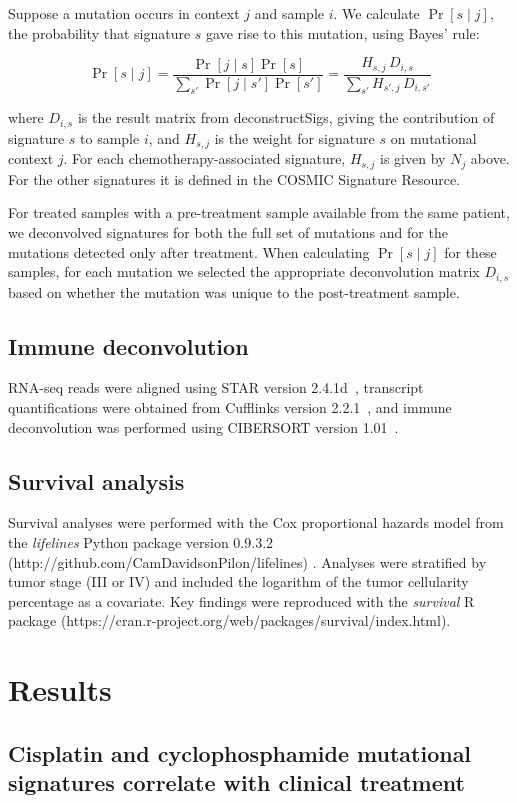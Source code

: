 \documentclass[linenumbers]{bmcart}
\begin{document}
Suppose a mutation occurs in context $j$ and sample $i$. We calculate $\Pr[s \mid j]$, the probability that signature $s$ gave rise to this mutation, using Bayes' rule:

\[
\Pr[s \mid j] = \frac{\Pr[j \mid s] \Pr[s]}{\sum_{s'}{\Pr[j \mid s']\Pr[s']}} = \frac{H_{s,j} \, D_{i,s}}{\sum_{s'}{H_{s',j} \, D_{i,s'}}}
\]

where $D_{i,s}$ is the result matrix from deconstructSigs, giving the contribution of signature $s$ to sample $i$, and $H_{s,j}$ is the weight for signature $s$ on mutational context $j$. For each chemotherapy-associated signature, $H_{s,j}$ is given by $N_j$ above. For the other signatures it is defined in the COSMIC Signature Resource.

For treated samples with a pre-treatment sample available from the same patient, we deconvolved signatures for both the full set of mutations and for the mutations detected only after treatment. When calculating $\Pr[s \mid j]$ for these samples, for each mutation we selected the appropriate deconvolution matrix $D_{i,s}$ based on whether the mutation was unique to the post-treatment sample.

\subsection*{Immune deconvolution}
RNA-seq reads were aligned using STAR version 2.4.1d~\cite{dobin2013}, transcript quantifications were obtained from Cufflinks version 2.2.1~\cite{trapnell2010}, and immune deconvolution was performed using CIBERSORT version 1.01~\cite{newman2015}. 

\subsection*{Survival analysis}
Survival analyses were performed with the Cox proportional hazards model from the \textit{lifelines} Python package version 0.9.3.2 (http://github.com/CamDavidsonPilon/lifelines) . Analyses were stratified by tumor stage (III or IV) and included the logarithm of the tumor cellularity percentage as a covariate. Key findings were reproduced with the \textit{survival} R package (https://cran.r-project.org/web/packages/survival/index.html).


\section*{Results}

\subsection*{Cisplatin and cyclophosphamide mutational signatures correlate with clinical treatment}
\end{document}

